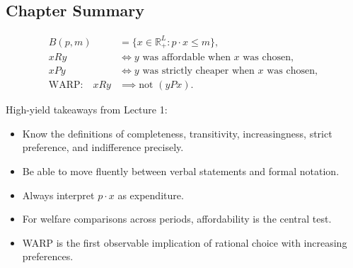 \subsection{Chapter Summary}

\begin{keyformula}[title={Key Formula: Chapter 1 Summary}]
\begin{align*}
B(p,m) &= \{x \in \mathbb{R}^L_+ : p \cdot x \le m\}, \\
x R y &\iff y \text{ was affordable when } x \text{ was chosen}, \\
x P y &\iff y \text{ was strictly cheaper when } x \text{ was chosen}, \\
\text{WARP:} \quad x R y &\implies \text{not } (y P x).
\end{align*}
\end{keyformula}

\begin{examtip}
High-yield takeaways from Lecture 1:
\begin{itemize}
    \item Know the definitions of completeness, transitivity, increasingness, strict preference, and indifference precisely.
    \item Be able to move fluently between verbal statements and formal notation.
    \item Always interpret $p \cdot x$ as expenditure.
    \item For welfare comparisons across periods, affordability is the central test.
    \item WARP is the first observable implication of rational choice with increasing preferences.
\end{itemize}
\end{examtip}